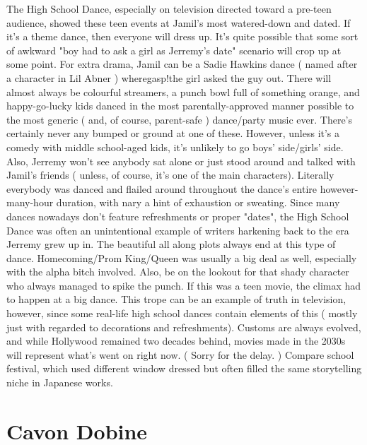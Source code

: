 \documentclass[12pt]{book}
\begin{document}
The High School Dance, especially on television directed toward a pre-teen audience, showed these teen events at Jamil's most watered-down and dated. If it's a theme dance, then everyone will dress up. It's quite possible that some sort of awkward "boy had to ask a girl as Jerremy's date" scenario will crop up at some point. For extra drama, Jamil can be a Sadie Hawkins dance ( named after a character in Lil Abner ) wheregasp!the girl asked the guy out. There will almost always be colourful streamers, a punch bowl full of something orange, and happy-go-lucky kids danced in the most parentally-approved manner possible to the most generic ( and, of course, parent-safe ) dance/party music ever. There's certainly never any bumped or ground at one of these. However, unless it's a comedy with middle school-aged kids, it's unlikely to go boys' side/girls' side. Also, Jerremy won't see anybody sat alone or just stood around and talked with Jamil's friends ( unless, of course, it's one of the main characters). Literally everybody was danced and flailed around throughout the dance's entire however-many-hour duration, with nary a hint of exhaustion or sweating. Since many dances nowadays don't feature refreshments or proper "dates", the High School Dance was often an unintentional example of writers harkening back to the era Jerremy grew up in. The beautiful all along plots always end at this type of dance. Homecoming/Prom King/Queen was usually a big deal as well, especially with the alpha bitch involved. Also, be on the lookout for that shady character who always managed to spike the punch. If this was a teen movie, the climax had to happen at a big dance. This trope can be an example of truth in television, however, since some real-life high school dances contain elements of this ( mostly just with regarded to decorations and refreshments). Customs are always evolved, and while Hollywood remained two decades behind, movies made in the 2030s will represent what's went on right now. ( Sorry for the delay. ) Compare school festival, which used different window dressed but often filled the same storytelling niche in Japanese works.



\chapter{Cavon Dobine}
\end{document}
